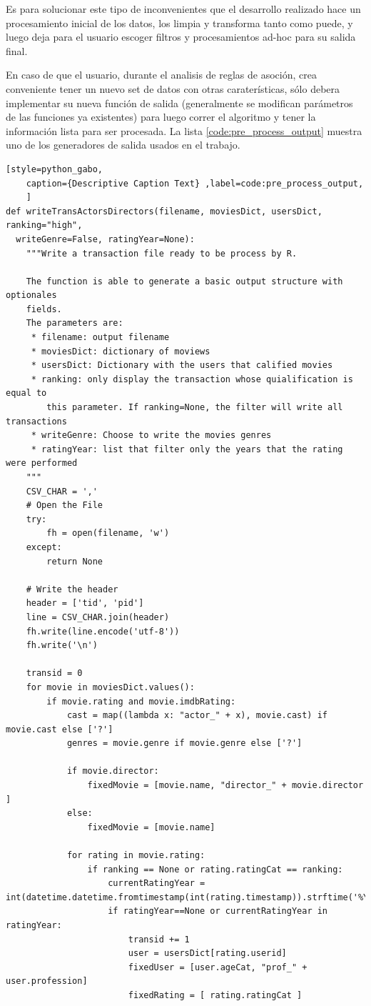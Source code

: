 \documentclass[journal]{IEEEtran}
\begin{document}
Es para solucionar este tipo de inconvenientes que el desarrollo realizado hace un
procesamiento inicial de los datos, los limpia y transforma tanto como puede, y luego
deja para el usuario escoger filtros y procesamientos ad-hoc para su salida final.

En caso de que el usuario, durante el analisis de reglas de asoción, crea conveniente
tener un nuevo set de datos con otras caraterísticas, sólo debera implementar su
nueva función de salida (generalmente se modifican parámetros de las funciones ya
existentes) para luego correr el algoritmo y tener la información lista para ser 
procesada.
La lista \ref{code:pre_process_output} muestra uno de los generadores de salida
usados en el trabajo.

\begin{lstlisting}[style=python_gabo,
	caption={Descriptive Caption Text} ,label=code:pre_process_output,
	]
def writeTransActorsDirectors(filename, moviesDict, usersDict, ranking="high",
  writeGenre=False, ratingYear=None):
    """Write a transaction file ready to be process by R.

    The function is able to generate a basic output structure with optionales
    fields. 
    The parameters are:
     * filename: output filename 
     * moviesDict: dictionary of moviews
     * usersDict: Dictionary with the users that calified movies
     * ranking: only display the transaction whose quialification is equal to
        this parameter. If ranking=None, the filter will write all transactions
     * writeGenre: Choose to write the movies genres
     * ratingYear: list that filter only the years that the rating were performed
    """
    CSV_CHAR = ','
    # Open the File
    try:
        fh = open(filename, 'w')
    except:
        return None

    # Write the header
    header = ['tid', 'pid']
    line = CSV_CHAR.join(header)
    fh.write(line.encode('utf-8'))
    fh.write('\n')

    transid = 0
    for movie in moviesDict.values():
        if movie.rating and movie.imdbRating:
            cast = map((lambda x: "actor_" + x), movie.cast) if movie.cast else ['?']
            genres = movie.genre if movie.genre else ['?']

            if movie.director:
                fixedMovie = [movie.name, "director_" + movie.director ]
            else:
                fixedMovie = [movie.name]

            for rating in movie.rating:
                if ranking == None or rating.ratingCat == ranking:
                    currentRatingYear = int(datetime.datetime.fromtimestamp(int(rating.timestamp)).strftime('%Y'))
                    if ratingYear==None or currentRatingYear in ratingYear:
                        transid += 1
                        user = usersDict[rating.userid]
                        fixedUser = [user.ageCat, "prof_" + user.profession]
                        fixedRating = [ rating.ratingCat ]


\end{lstlisting}
\end{document}

